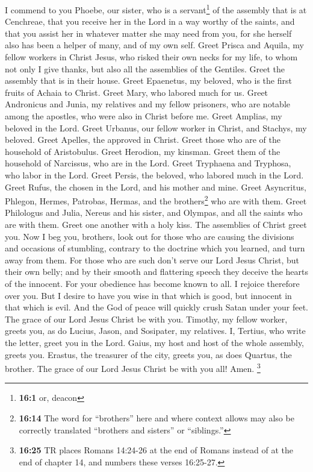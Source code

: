 I commend to you Phoebe, our sister, who is a
servant\footnote{\textbf{16:1} or, deacon} of the assembly that is at
Cenchreae,  that you receive her in the Lord in a way
worthy of the saints, and that you assist her in whatever matter she may
need from you, for she herself also has been a helper of many, and of my
own self.  Greet Prisca and Aquila, my fellow workers in
Christ Jesus,  who risked their own necks for my life, to
whom not only I give thanks, but also all the assemblies of the
Gentiles.  Greet the assembly that is in their house.
Greet Epaenetus, my beloved, who is the first fruits of Achaia to
Christ.  Greet Mary, who labored much for us.
 Greet Andronicus and Junia, my relatives and my fellow
prisoners, who are notable among the apostles, who were also in Christ
before me.  Greet Amplias, my beloved in the Lord.
 Greet Urbanus, our fellow worker in Christ, and Stachys,
my beloved.  Greet Apelles, the approved in Christ. Greet
those who are of the household of Aristobulus.  Greet
Herodion, my kinsman. Greet them of the household of Narcissus, who are
in the Lord.  Greet Tryphaena and Tryphosa, who labor in
the Lord. Greet Persis, the beloved, who labored much in the Lord.
 Greet Rufus, the chosen in the Lord, and his mother and
mine.  Greet Asyncritus, Phlegon, Hermes, Patrobas,
Hermas, and the brothers\footnote{\textbf{16:14} The word for
  ``brothers'' here and where context allows may also be correctly
  translated ``brothers and sisters'' or ``siblings.''} who are with
them.  Greet Philologus and Julia, Nereus and his sister,
and Olympas, and all the saints who are with them.  Greet
one another with a holy kiss. The assemblies of Christ greet you.
 Now I beg you, brothers, look out for those who are
causing the divisions and occasions of stumbling, contrary to the
doctrine which you learned, and turn away from them.  For
those who are such don't serve our Lord Jesus Christ, but their own
belly; and by their smooth and flattering speech they deceive the hearts
of the innocent.  For your obedience has become known to
all. I rejoice therefore over you. But I desire to have you wise in that
which is good, but innocent in that which is evil.  And
the God of peace will quickly crush Satan under your feet. The grace of
our Lord Jesus Christ be with you.  Timothy, my fellow
worker, greets you, as do Lucius, Jason, and Sosipater, my relatives.
 I, Tertius, who write the letter, greet you in the Lord.
 Gaius, my host and host of the whole assembly, greets
you. Erastus, the treasurer of the city, greets you, as does Quartus,
the brother.  The grace of our Lord Jesus Christ be with
you all! Amen.  \footnote{\textbf{16:25} TR places Romans
  14:24-26 at the end of Romans instead of at the end of chapter 14, and
  numbers these verses 16:25-27.}
